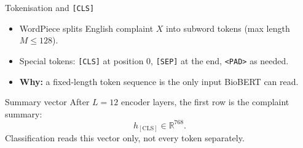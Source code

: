 
\begin{frame}{Tokenisation and \texttt{[CLS]}}
	\begin{itemize}
		\item WordPiece splits English complaint \(X\) into subword tokens (max length \(M \leq 128\)).
		\item Special tokens: \texttt{[CLS]} at position \(0\), \texttt{[SEP]} at the end, \texttt{<PAD>} as needed.
		\item \textbf{Why:} a fixed-length token sequence is the only input BioBERT can read.
	\end{itemize}
	\begin{block}{Summary vector}
		After \(L=12\) encoder layers, the first row is the complaint summary:
		\[
		  h_{\mathrm{[CLS]}} \in \mathbb{R}^{768}.
		\]
		Classification reads this vector only, not every token separately.
	\end{block}
\end{frame}

